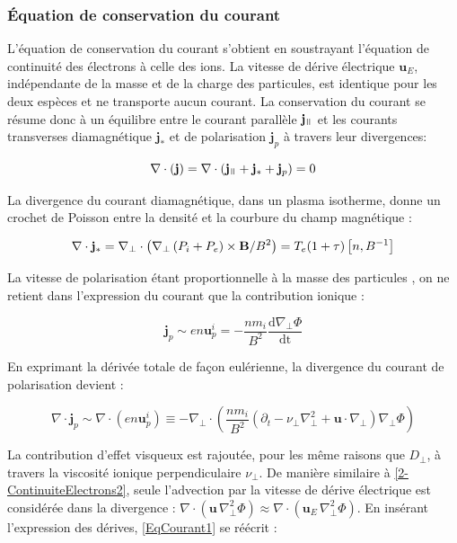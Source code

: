 \begin{refsection}
\subsubsection{Équation de conservation du courant}
L'équation de conservation du courant s'obtient en soustrayant l'équation de
continuité des électrons à celle des ions. La vitesse de dérive électrique
$\mathbf{u}_E$, indépendante de la masse et de la charge des particules,
est identique pour les deux espèces et ne transporte aucun courant. 
La conservation du courant se résume donc à un équilibre entre le courant
parallèle $\mathbf{j}_\para$ et les courants transverses diamagnétique
$\mathbf{j}_*$ et de polarisation $\mathbf{j}_p$ à travers leur
divergences:

\begin{equation}
\label{EqCourant1}
\nabla\cdot\left(\mathbf{j}\right) = 
\nabla\cdot\left(\mathbf{j}_\para+\mathbf{j}_*+\mathbf{j}_p\right)
= 0
\end{equation}

La divergence du courant diamagnétique, dans un plasma isotherme, donne un
crochet de Poisson entre la densité et la courbure du champ magnétique :

\begin{equation}
\nabla\cdot\mathbf{j}_*=
\nabla_\perp\cdot\left(\nabla_\perp\left(
P_i+P_e\right)\times\mathbf{B}/B^2\right) =
T_e(1+\tau)\left[n,B^{{-1}}\right]
\end{equation}

La vitesse de polarisation étant
proportionnelle à la masse des particules , on ne
retient dans l'expression du courant que la contribution ionique :

\begin{equation}
\mathbf{j}_p\sim
en\mathbf{u}^i_p=-\frac{nm_{i}}{B^2}\frac{\text{d}\nabla_\perp \Phi}{\text{dt}}
\end{equation}

En exprimant la dérivée totale de
façon eulérienne, la divergence du courant de polarisation devient :

\begin{equation}
\nabla\cdot\mathbf{j}_p\sim\nabla\cdot\left({e}n\mathbf{u}^i_p\right)\equiv
-\nabla_\perp\cdot\left(\frac{nm_{i}}{B^2}\left(\partial_{t} -
\nu_\perp \nabla_\perp^2 +
\mathbf{u}\cdot\nabla_\perp\right)\nabla_\perp \Phi\right)
\end{equation}

La contribution d'effet visqueux est rajoutée, pour les même raisons que
$D_\perp$, à travers la viscosité ionique perpendiculaire $\nu_\perp$.
De manière similaire à \eqref{2-ContinuiteElectrons2}, seule l'advection par la
vitesse de dérive électrique est considérée dans la divergence : 
$\nabla\cdot\left(\mathbf{u}\,\nabla_\perp^2 \Phi\right)
\approx\nabla\cdot\left(\mathbf{u}_E\,\nabla_\perp^2 \Phi\right)$.
En insérant l'expression des dérives, \eqref{EqCourant1} se réécrit :


\end{refsection}
